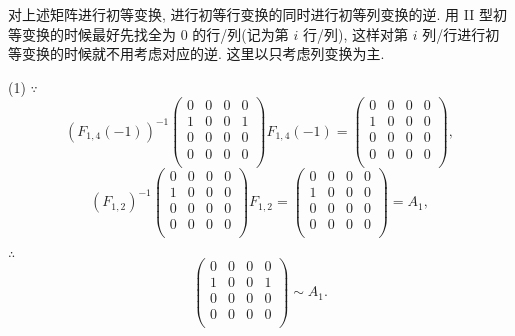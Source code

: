 \documentclass[color=black,device=normal,lang=cn,mode=geye]{elegantnote}
\begin{document}
\begin{solution}
    对上述矩阵进行初等变换, 进行初等行变换的同时进行初等列变换的逆. 用 II 型初等变换的时候最好先找全为 $0$ 的行/列(记为第 $i$ 行/列), 这样对第 $i$ 列/行进行初等变换的时候就不用考虑对应的逆. 这里以只考虑列变换为主.
    
    (1) $\because$
    \[(F_{1,4}(-1))^{-1}\begin{pmatrix}
        0 & 0 & 0 & 0 \\
        1 & 0 & 0 & 1 \\
        0 & 0 & 0 & 0 \\
        0 & 0 & 0 & 0 \\
    \end{pmatrix}F_{1,4}(-1)=\begin{pmatrix}
        0 & 0 & 0 & 0 \\
        1 & 0 & 0 & 0 \\
        0 & 0 & 0 & 0 \\
        0 & 0 & 0 & 0 \\
    \end{pmatrix},\]
    \[(F_{1,2})^{-1}\begin{pmatrix}
        0 & 0 & 0 & 0 \\
        1 & 0 & 0 & 0 \\
        0 & 0 & 0 & 0 \\
        0 & 0 & 0 & 0 \\
    \end{pmatrix}F_{1,2}=\begin{pmatrix}
        0 & 0 & 0 & 0 \\
        1 & 0 & 0 & 0 \\
        0 & 0 & 0 & 0 \\
        0 & 0 & 0 & 0 \\
    \end{pmatrix}=A_1,\]

    $\therefore$
    \[\begin{pmatrix}
        0 & 0 & 0 & 0 \\
        1 & 0 & 0 & 1 \\
        0 & 0 & 0 & 0 \\
        0 & 0 & 0 & 0 \\
    \end{pmatrix}\sim A_1.\]


\end{solution}
\end{document}
